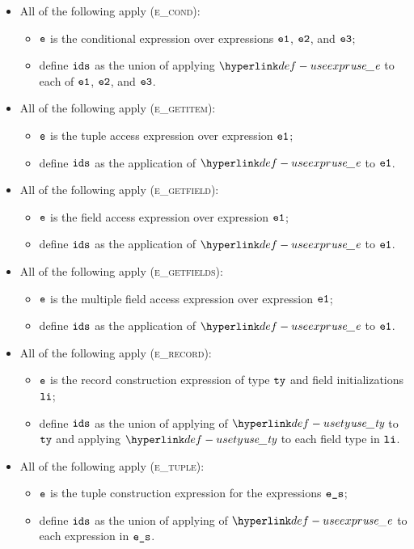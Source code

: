 \begin{itemize}
  \item All of the following apply (\textsc{e\_cond}):
  \begin{itemize}
    \item $\texttt{e}$ is the conditional expression over expressions $\texttt{e1}$, $\texttt{e2}$, and $\texttt{e3}$;
    \item define $\texttt{ids}$ as the union of applying $\useexpr$ to each of $\texttt{e1}$, $\texttt{e2}$, and $\texttt{e3}$.
  \end{itemize}

  \item All of the following apply (\textsc{e\_getitem}):
  \begin{itemize}
    \item $\texttt{e}$ is the tuple access expression over expression $\texttt{e1}$;
    \item define $\texttt{ids}$ as the application of $\useexpr$ to $\texttt{e1}$.
  \end{itemize}

  \item All of the following apply (\textsc{e\_getfield}):
  \begin{itemize}
    \item $\texttt{e}$ is the field access expression over expression $\texttt{e1}$;
    \item define $\texttt{ids}$ as the application of $\useexpr$ to $\texttt{e1}$.
  \end{itemize}

  \item All of the following apply (\textsc{e\_getfields}):
  \begin{itemize}
    \item $\texttt{e}$ is the multiple field access expression over expression $\texttt{e1}$;
    \item define $\texttt{ids}$ as the application of $\useexpr$ to $\texttt{e1}$.
  \end{itemize}

  \item All of the following apply (\textsc{e\_record}):
  \begin{itemize}
    \item $\texttt{e}$ is the record construction expression of type $\texttt{ty}$ and field initializations $\texttt{li}$;
    \item define $\texttt{ids}$ as the union of applying of $\usety$ to $\texttt{ty}$ and applying $\usety$ to each field type in $\texttt{li}$.
  \end{itemize}

  \item All of the following apply (\textsc{e\_tuple}):
  \begin{itemize}
    \item $\texttt{e}$ is the tuple construction expression for the expressions $\texttt{e\_s}$;
    \item define $\texttt{ids}$ as the union of applying of $\useexpr$ to each expression in $\texttt{e\_s}$.
  \end{itemize}


\end{itemize}
